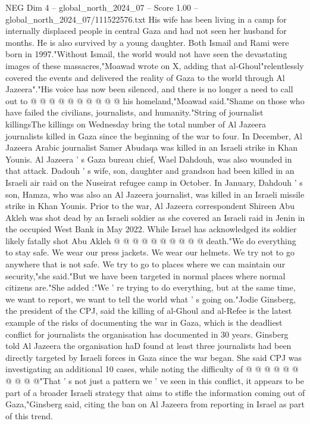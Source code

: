 \begin{textsample}{NEG Dim 4 – global\_north\_2024\_07 – Score 1.00 – global\_north\_2024\_07/111522576.txt}
His wife has been living in a camp for internally displaced people in central Gaza and had not seen her husband for months.
He is also survived by a young daughter.
Both Ismail and Rami were born in 1997."Without Ismail, the world would not have seen the devastating images of these massacres,"Moawad wrote on X, adding that al-Ghoul"relentlessly covered the events and delivered the reality of Gaza to the world through Al Jazeera"."His voice has now been silenced, and there is no longer a need to call out to @ @ @ @ @ @ @ @ @ @ his homeland,"Moawad said."Shame on those who have failed the civilians, journalists, and humanity."String of journalist killingsThe killings on Wednesday bring the total number of Al Jazeera journalists killed in Gaza since the beginning of the war to four.
In December, Al Jazeera Arabic journalist Samer Abudaqa was killed in an Israeli strike in Khan Younis.
Al Jazeera ' s Gaza bureau chief, Wael Dahdouh, was also wounded in that attack.
Dadouh ' s wife, son, daughter and grandson had been killed in an Israeli air raid on the Nuseirat refugee camp in October.
In January, Dahdouh ' s son, Hamza, who was also an Al Jazeera journalist, was killed in an Israeli missile strike in Khan Younis.
Prior to the war, Al Jazeera correspondent Shireen Abu Akleh was shot dead by an Israeli soldier as she covered an Israeli raid in Jenin in the occupied West Bank in May 2022.
While Israel has acknowledged its soldier likely fatally shot Abu Akleh @ @ @ @ @ @ @ @ @ @ death."We do everything to stay safe.
We wear our press jackets.
We wear our helmets.
We try not to go anywhere that is not safe.
We try to go to places where we can maintain our security,"she said."But we have been targeted in normal places where normal citizens are."She added :"We ' re trying to do everything, but at the same time, we want to report, we want to tell the world what ' s going on."Jodie Ginsberg, the president of the CPJ, said the killing of al-Ghoul and al-Refee is the latest example of the risks of documenting the war in Gaza, which is the deadliest conflict for journalists the organisation has documented in 30 years.
Ginsberg told Al Jazeera the organisation haD found at least three journalists had been directly targeted by Israeli forces in Gaza since the war began.
She said CPJ was investigating an additional 10 cases, while noting the difficulty of @ @ @ @ @ @ @ @ @ @"That ' s not just a pattern we ' ve seen in this conflict, it appears to be part of a broader Israeli strategy that aims to stifle the information coming out of Gaza,"Ginsberg said, citing the ban on Al Jazeera from reporting in Israel as part of this trend.

\end{textsample}
